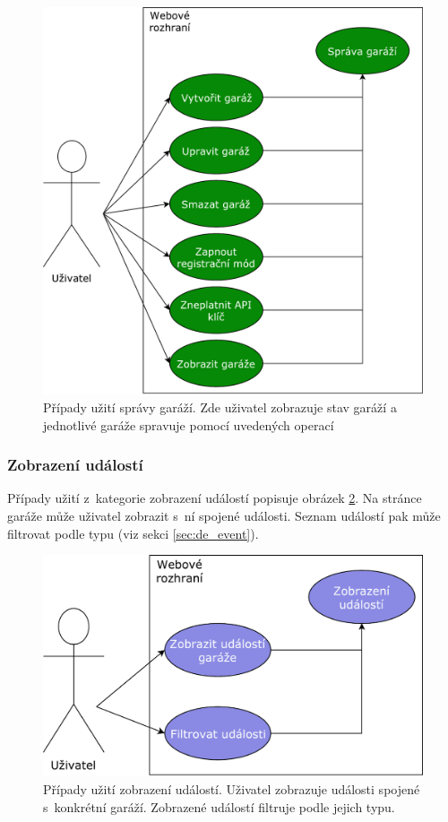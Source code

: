 \begin{figure}[h!]
    \centering
    \includegraphics[width=\textwidth]{images/use_case_garage.pdf}
    \caption[Případy užití správy garáží]{Případy užití správy garáží. Zde uživatel zobrazuje stav garáží a jednotlivé garáže spravuje pomocí uvedených operací}
    \label{fig:use_case_garage}
\end{figure}

\subsubsection{Zobrazení událostí}

Případy užití z~kategorie zobrazení událostí popisuje obrázek \ref{fig:use_case_events}. Na stránce garáže může uživatel zobrazit s~ní spojené události. Seznam událostí pak může filtrovat podle typu (viz sekci \ref{sec:de_event}).

\begin{figure}[h!]
    \centering
    \includegraphics[width=\textwidth]{images/use_case_events.pdf}
    \caption[Případy užití zobrazení událostí]{Případy užití zobrazení událostí. Uživatel zobrazuje události spojené s~konkrétní garáží. Zobrazené událostí filtruje podle jejich typu.}
    \label{fig:use_case_events}
\end{figure}

